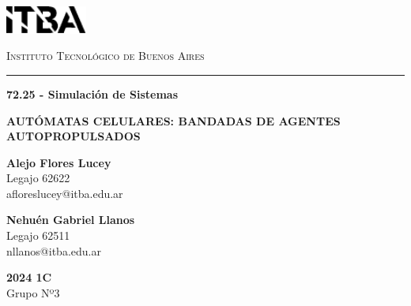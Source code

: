 \documentclass[11pt, a4paper]{article}
\begin{document}
    \begin{titlepage}
        \begin{center}
            \begin{spacing}{1.5}
                \centering
                \includegraphics[width=0.2\textwidth]{./itba}
            \end{spacing}
            {\scshape\Large Instituto Tecnológico de Buenos Aires}
            {\rule{\textwidth}{0.4pt}}
            {\textbf{72.25 - Simulación de Sistemas }}
        \end{center}

        \vspace{35mm}

        \begin{center}
            \begin{spacing}{1.5}
                {\LARGE{\textbf{AUTÓMATAS CELULARES: BANDADAS DE AGENTES AUTOPROPULSADOS}}}
            \end{spacing}
        \end{center}

        \vspace{50mm}

        \begin{minipage}[t]{0.47\textwidth}
            \begin{center}
                {\textbf{Alejo Flores Lucey}}
                \\
                Legajo 62622
                \\
                {afloreslucey@itba.edu.ar}
            \end{center}
        \end{minipage}
        \hfill
        \begin{minipage}[t]{0.47\textwidth}
            \begin{center}
                {\textbf{Nehuén Gabriel Llanos}}
                \\
                Legajo 62511
                \\
                {nllanos@itba.edu.ar}
            \end{center}
        \end{minipage}

        \vspace{25mm}

        \begin{center}
            {\large{\textbf{2024 1C}}}
            \\
            {\large{Grupo Nº3}}
        \end{center}
    \end{titlepage}
\end{document}
